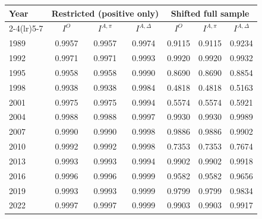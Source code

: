 \begin{tabular}{lcccccc}
\toprule
Year & \multicolumn{3}{c}{Restricted (positive only)} & \multicolumn{3}{c}{Shifted full sample} \\
\cmidrule(lr){2-4}\cmidrule(lr){5-7}
& $I^{O}$ & $I^{A,\pi}$ & $I^{A,\Delta}$ & $I^{O}$ & $I^{A,\pi}$ & $I^{A,\Delta}$ \\
\midrule
1989 & 0.9957 & 0.9957 & 0.9974 & 0.9115 & 0.9115 & 0.9234 \\
1992 & 0.9971 & 0.9971 & 0.9993 & 0.9920 & 0.9920 & 0.9932 \\
1995 & 0.9958 & 0.9958 & 0.9990 & 0.8690 & 0.8690 & 0.8854 \\
1998 & 0.9938 & 0.9938 & 0.9984 & 0.4818 & 0.4818 & 0.5163 \\
2001 & 0.9975 & 0.9975 & 0.9994 & 0.5574 & 0.5574 & 0.5921 \\
2004 & 0.9988 & 0.9988 & 0.9997 & 0.9930 & 0.9930 & 0.9989 \\
2007 & 0.9990 & 0.9990 & 0.9998 & 0.9886 & 0.9886 & 0.9902 \\
2010 & 0.9992 & 0.9992 & 0.9998 & 0.7353 & 0.7353 & 0.7674 \\
2013 & 0.9993 & 0.9993 & 0.9994 & 0.9902 & 0.9902 & 0.9918 \\
2016 & 0.9996 & 0.9996 & 0.9999 & 0.9582 & 0.9582 & 0.9656 \\
2019 & 0.9993 & 0.9993 & 0.9999 & 0.9799 & 0.9799 & 0.9834 \\
2022 & 0.9997 & 0.9997 & 0.9999 & 0.9903 & 0.9903 & 0.9917 \\
\bottomrule
\end{tabular}

